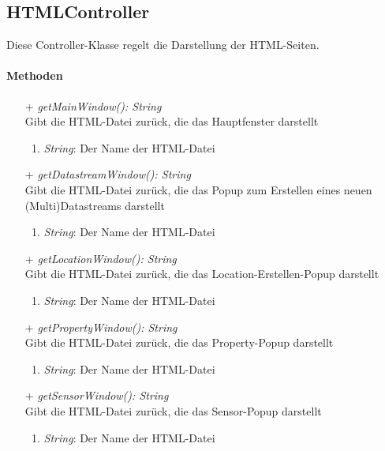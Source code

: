 \subsection*{HTMLController}\label{htmlCon}
Diese Controller-Klasse regelt die Darstellung der HTML-Seiten.


\paragraph{Methoden}
\begin{itemize}
	\item[+] \textit{ getMainWindow(): String } \\
	Gibt die HTML-Datei zurück, die das Hauptfenster darstellt
	\begin{enumerate}[$\circ$]
		\item \textit{String}: Der Name der HTML-Datei
	\end{enumerate}

	\item[+] \textit{ getDatastreamWindow(): String } \\
	Gibt die HTML-Datei zurück, die das Popup zum Erstellen eines neuen (Multi)Datastreams darstellt
	\begin{enumerate}[$\circ$]
		\item \textit{String}: Der Name der HTML-Datei
	\end{enumerate}

	\item[+] \textit{ getLocationWindow(): String } \\
	Gibt die HTML-Datei zurück, die das Location-Erstellen-Popup darstellt
	\begin{enumerate}[$\circ$]
		\item \textit{String}: Der Name der HTML-Datei
	\end{enumerate}

	\item[+] \textit{ getPropertyWindow(): String } \\
	Gibt die HTML-Datei zurück, die das Property-Popup darstellt
	\begin{enumerate}[$\circ$]
		\item \textit{String}: Der Name der HTML-Datei
	\end{enumerate}

	\item[+] \textit{ getSensorWindow(): String } \\
	Gibt die HTML-Datei zurück, die das Sensor-Popup darstellt
	\begin{enumerate}[$\circ$]
		\item \textit{String}: Der Name der HTML-Datei
	\end{enumerate}


\end{itemize}
